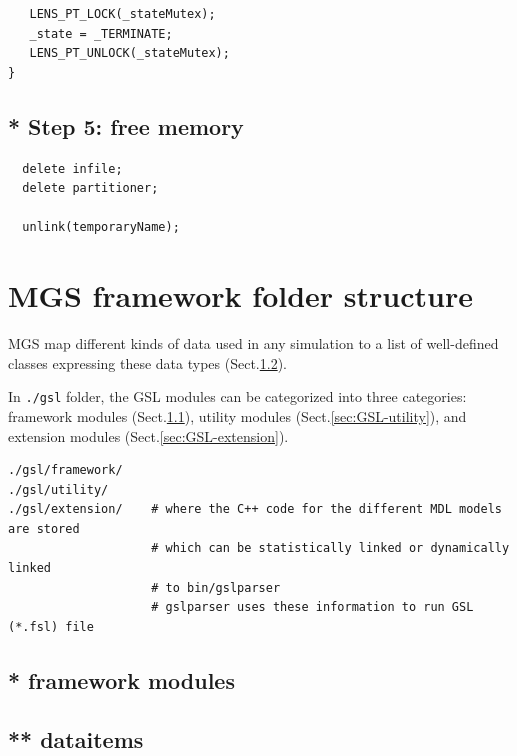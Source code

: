 \begin{lstlisting}
   LENS_PT_LOCK(_stateMutex);                                                                                 
   _state = _TERMINATE;                                                                                       
   LENS_PT_UNLOCK(_stateMutex);                                                                               
}                                               
\end{lstlisting}

\subsection{* Step 5: free memory}

\begin{lstlisting}
  delete infile;
  delete partitioner;

  unlink(temporaryName);
\end{lstlisting}


\section{MGS framework folder structure}
\label{sec:GSL-code-folder}

MGS map different kinds of data used in any simulation to a list of well-defined
classes expressing these data types (Sect.\ref{sec:gsl-dataitems}).

In \verb!./gsl! folder, the GSL modules can be categorized into three
categories: framework modules (Sect.\ref{sec:MGS-framework}), utility modules
(Sect.\ref{sec:GSL-utility}), and extension modules
(Sect.\ref{sec:GSL-extension}).
\begin{verbatim}
./gsl/framework/
./gsl/utility/
./gsl/extension/    # where the C++ code for the different MDL models are stored
                    # which can be statistically linked or dynamically linked
                    # to bin/gslparser
                    # gslparser uses these information to run GSL (*.fsl) file
\end{verbatim}


\subsection{* framework modules}
\label{sec:MGS-framework}

\subsection{ ** dataitems}
\label{sec:gsl-dataitems}

